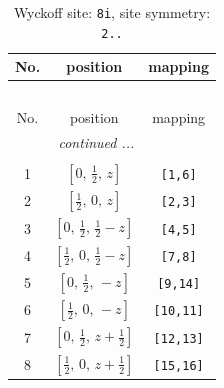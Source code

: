\documentclass[fleqn,8pt]{jsarticle}
\begin{document}
\renewcommand{\arraystretch}{1.2}
\begin{longtable}{ccc}
\caption{Wyckoff site: {\tt 8i}, site symmetry: {\tt 2..}}
 \\
 \hline \hline
No. & position & mapping \\ \hline \endfirsthead

\multicolumn{2}{l}{\tablename\ \thetable{}} \\
 \hline \hline
No. & position & mapping \\ \hline \endhead

 \hline \hline
\multicolumn{2}{r}{\footnotesize\it continued ...} \\ \endfoot

 \hline \hline
\multicolumn{2}{r}{} \\ \endlastfoot

1 & $\left[ 0,\, \frac{1}{2},\, z \right]$ & {\tt [1,6]} \\ \hline
2 & $\left[ \frac{1}{2},\, 0,\, z \right]$ & {\tt [2,3]} \\ \hline
3 & $\left[ 0,\, \frac{1}{2},\, \frac{1}{2} - z \right]$ & {\tt [4,5]} \\ \hline
4 & $\left[ \frac{1}{2},\, 0,\, \frac{1}{2} - z \right]$ & {\tt [7,8]} \\ \hline
5 & $\left[ 0,\, \frac{1}{2},\, - z \right]$ & {\tt [9,14]} \\ \hline
6 & $\left[ \frac{1}{2},\, 0,\, - z \right]$ & {\tt [10,11]} \\ \hline
7 & $\left[ 0,\, \frac{1}{2},\, z + \frac{1}{2} \right]$ & {\tt [12,13]} \\ \hline
8 & $\left[ \frac{1}{2},\, 0,\, z + \frac{1}{2} \right]$ & {\tt [15,16]} \\
\end{longtable}
\renewcommand{\arraystretch}{1.2}
\end{document}
